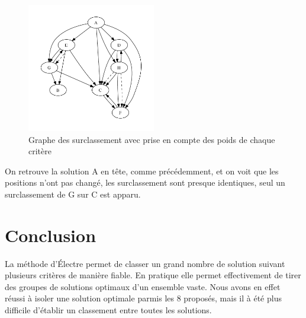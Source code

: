 \clearpage
	
\begin{figure}[!h]
\begin{center}
\includegraphics[width=0.5\textwidth]{../SourcesMatlab/electre3-2.pdf}
\caption{Graphe des surclassement avec prise en compte des poids de chaque critère}
\end{center}
\end{figure}

On retrouve la solution A en tête, comme précédemment, et on voit que les positions n'ont pas changé, les surclassement sont presque identiques, seul un surclassement de G sur C est apparu.

\section{Conclusion}

La méthode d'Électre  permet de classer un grand nombre de solution suivant plusieurs critères de manière fiable. En pratique elle permet effectivement de tirer des groupes de solutions optimaux d'un ensemble vaste.
Nous avons en effet réussi à isoler une solution optimale parmis les 8 proposés, mais il à été plus difficile d'établir un classement entre toutes les solutions.